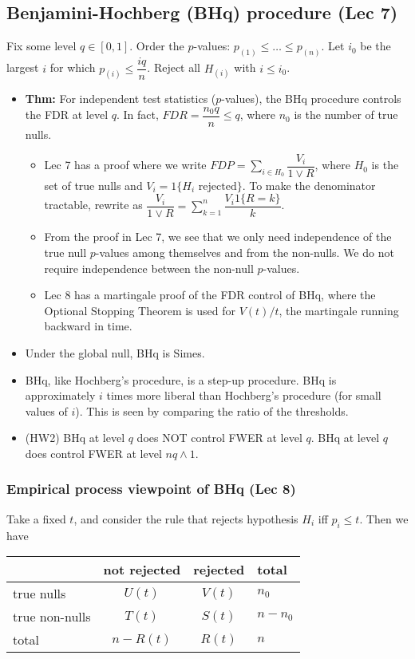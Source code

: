 \documentclass[twoside]{article}
\newcommand\dis{\displaystyle}
\begin{document}
\subsection{Benjamini-Hochberg (BHq) procedure (Lec 7)}
Fix some level $q \in [0,1]$. Order the $p$-values: $p_{(1)} \leq \dots \leq p_{(n)}$. Let $i_0$ be the largest $i$ for which $p_{(i)} \leq \dfrac{iq}{n}$. Reject all $H_{(i)}$ with $i \leq i_0$.

\begin{itemize}
\item \textbf{Thm:} For independent test statistics ($p$-values), the BHq procedure controls the FDR at level $q$. In fact, $FDR = \dfrac{n_0 q}{n} \leq q$, where $n_0$ is the number of true nulls.
\begin{itemize}
\item Lec 7 has a proof where we write $FDP = \dis\sum_{i \in H_0} \dfrac{V_i}{1 \vee R}$, where $H_0$ is the set of true nulls and $V_i = 1\{ H_i \text{ rejected} \}$. To make the denominator tractable, rewrite as $\dfrac{V_i}{1 \vee R} = \dis\sum_{k=1}^n \dfrac{V_i 1\{ R=k \}}{k}$.

\item From the proof in Lec 7, we see that we only need independence of the true null $p$-values among themselves and from the non-nulls. We do not require independence between the non-null $p$-values.

\item Lec 8 has a martingale proof of the FDR control of BHq, where the Optional Stopping Theorem is used for $V(t)/t$, the martingale running backward in time.
\end{itemize}

\item Under the global null, BHq is Simes.

\item BHq, like Hochberg's procedure, is a step-up procedure. BHq is approximately $i$ times more liberal than Hochberg's procedure (for small values of $i$). This is seen by comparing the ratio of the thresholds.

\item (HW2) BHq at level $q$ does NOT control FWER at level $q$. BHq at level $q$ does control FWER at level $nq \wedge 1$.
\end{itemize}

\subsubsection{Empirical process viewpoint of BHq (Lec 8)}
Take a fixed $t$, and consider the rule that rejects hypothesis $H_i$ iff $p_{i} \leq t$. Then we have
\begin{center}
  \begin{tabular}{l|cc|l}
  	& not rejected & rejected & total \\ \hline
    true nulls & $U(t)$ & $V(t)$ & $n_0$  \\
    true non-nulls & $T(t)$ & $S(t)$ & $n-n_0$ \\ \hline
    total & $n-R(t)$ & $R(t)$ & $n$
  \end{tabular}
\end{center}
\end{document}
